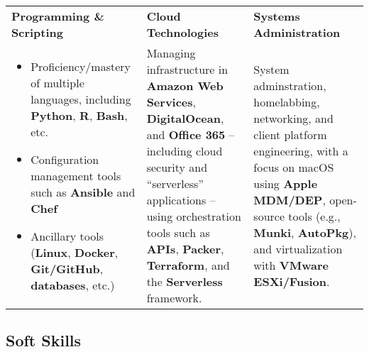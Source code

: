 \documentclass[10pt]{article}
\newcommand{\afterlistspace}[0]{\vspace{-1.5em}}
\begin{document}
\begin{tabularx}{\linewidth}{
    >{\hsize=1\hsize}X|%
    >{\hsize=1\hsize}X|%
    >{\hsize=1\hsize}X%
  }
    \textbf{Programming \& Scripting}
    & \textbf{Cloud Technologies}
    & \textbf{Systems Administration}
    \\
    \begin{itemize}[noitemsep,topsep=0pt]
        \vspace{-0.75em}

        \item Proficiency/mastery of multiple languages, including \textbf{Python}, \textbf{R}, \textbf{Bash}, %
        etc.

        \item Configuration management tools such as \textbf{Ansible} and \textbf{Chef}

        \item Ancillary tools (\textbf{Linux}, \textbf{Docker}, \textbf{Git/GitHub}, \textbf{databases}, etc.)
        
        \afterlistspace
    \end{itemize}

    & Managing infrastructure in \textbf{Amazon Web Services}, \textbf{DigitalOcean}, and \textbf{Office 365} -- including cloud security and ``serverless'' applications -- using orchestration tools such as \textbf{APIs}, \textbf{Packer}, \textbf{Terraform}, and the \textbf{Serverless} framework.

    & %

    System adminstration, homelabbing, networking, and client platform engineering, with a focus on macOS using \textbf{Apple MDM/DEP}, open-source tools (e.g., \textbf{Munki}, \textbf{AutoPkg}), and virtualization with \textbf{VMware ESXi/Fusion}.
    
\end{tabularx}


\subsection{Soft Skills}
\end{document}
